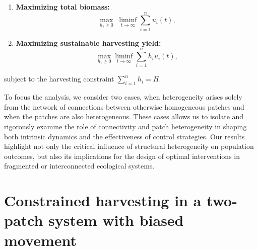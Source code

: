 \documentclass[11pt]{article}
\theoremstyle{definition}
\begin{document}
\begin{enumerate}
\item {\bf Maximizing total biomass:} 
$$\max_{h_i \ge 0} \; \liminf_{t\to\infty} \sum_{i=1}^n u_i(t),$$

\item {\bf Maximizing sustainable harvesting yield:}  
$$ \max_{h_i\geq 0} \liminf_{t\to\infty} \sum_{i=1}^n h_i u_i(t),$$
\end{enumerate}
subject to the harvesting constraint $\sum_{i=1}^n h_i = H$.

 To focus the analysis, we consider two cases, when  heterogeneity arises solely from the network of connections between otherwise homogeneous patches and when the patches are also heterogeneous. These cases allows us to isolate and rigorously examine the role of connectivity and patch heterogeneity in shaping both intrinsic dynamics and the effectiveness of control strategies. Our results highlight not only the critical influence of structural heterogeneity on population outcomes, but also its implications for the design of optimal interventions in fragmented or interconnected ecological systems.

\section{Constrained harvesting in a two-patch system with biased movement}\label{section constrained harvest}
\end{document}
